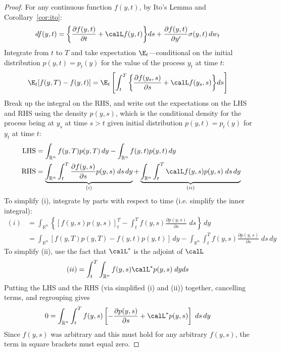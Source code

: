 \documentclass[12pt]{article}
\theoremstyle{plain}
\theoremstyle{definition}
\theoremstyle{remark}
\newcommand{\Rn}{\mathbb{R}^n}
\begin{document}
\begin{proof}
For any continuous function $f(y,t)$, by Ito's Lemma and
Corollary~\ref{cor:ito}:
\begin{align*}
  df(y,t)
  &=
  \bigg\{
  \frac{\partial f(y,t)}{\partial t}
  +
  \calL f(y,t)
  \bigg\}
  ds
  +
  \frac{\partial f(y,t)}{\partial y'}
  \sigma(y,t)
  \,dw_t
\end{align*}
Integrate from $t$ to $T$ and take expectation $\E_t$---conditional on
the initial distribution $p(y,t)=p_t(y)$ for the value of the process
$y_t$ at time $t$:
\begin{align*}
  \E_t[f(y,T)-f(y,t)]
  &=
  \E_t\left[
  \int_t^T
  \bigg\{
  \frac{\partial f(y_s,s)}{\partial s}
  +
  \calL f(y_s,s)
  \bigg\}
  ds
  \right]
\end{align*}
Break up the integral on the RHS, and write out the expectations on the
LHS and RHS using the density $p(y,s)$, which is the conditional density
for the process being at $y_s$ at time $s>t$ given initial distribution
$p(y,t)=p_t(y)$ for $y_t$ at time $t$:
\begin{align*}
  \text{LHS}
  &=
  \int_{\Rn}
  f(y,T)
  p(y,T)
  \,dy
  -
  \int_{\Rn}
  f(y,t)
  p(y,t)
  \,dy
  \\
  \text{RHS}
  &=
  \underbrace{%
    \int_{\Rn}
    \int_t^T
    \frac{\partial f(y,s)}{\partial s}
    p(y,s)
    \;ds
    \,dy
  }_{(i)}
  +
  \underbrace{%
    \int_{\Rn}
    \int_t^T
    \calL f(y,s)
    p(y,s)
    \;ds
    \,dy
  }_{(ii)}
\end{align*}
To simplify (i), integrate by parts with respect to time (i.e. simplify
the inner integral):
\begin{align*}
  (i)
  &=
  \int_{\Rn}
  \left\{
  \left[
    f(y,s)
    p(y,s)
  \right]_t^T
  -
  \int_t^T
  f(y,s)\frac{\partial p(y,s)}{\partial s}
  \;ds
  \right\}
  \,dy
  \\
  &=
  \int_{\Rn}
  \left[
    f(y,T)
    p(y,T)
    -
    f(y,t)
    p(y,t)
  \right]
  \,dy
  -
  \int_{\Rn}
  \int_t^T
  f(y,s)\frac{\partial p(y,s)}{\partial s}
  \;ds
  \,dy
\end{align*}
To simplify (ii), use the fact that $\calL^*$ is the adjoint of $\calL$
\begin{align*}
  (ii)
  &=
  \int_t^T
  \int_{\Rn}
  f(y,s)
  \calL^* p(y,s)
  \;dy
  ds
\end{align*}
Putting the LHS and the RHS (via simplified (i) and (ii)) together,
cancelling terms, and regrouping gives
\begin{align*}
  0
  &=
  \int_{\Rn}
  \int_t^T
  f(y,s)
  \left[
  -\frac{\partial p(y,s)}{\partial s}
  +
  \calL^* p(y,s)
  \right]
  \;ds
  \,dy
\end{align*}
Since $f(y,s)$ was arbitrary and this must hold for any arbitrary
$f(y,s)$, the term in square brackets must equal zero.
\end{proof}
\end{document}
